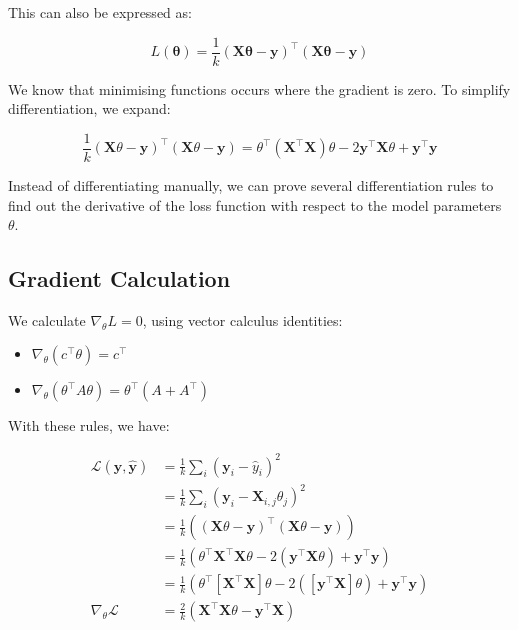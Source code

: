 This can also be expressed as:

\[
    L(\bm{\theta}) = \frac{1}{k} (\bm{X} \bm{\theta} - \bm{y})^\top (\bm{X} \bm{\theta} - \bm{y})
\]

We know that minimising functions occurs where the gradient is zero. To simplify differentiation, we expand:

\[
    \frac{1}{k} (\bm{X} \theta - \bm{y})^\top (\bm{X} \theta - \bm{y})
    = \theta^\top (\bm{X}^\top \bm{X}) \theta - 2 \bm{y}^\top \bm{X} \theta + \bm{y}^\top \bm{y}
\]


Instead of differentiating manually, we can prove several differentiation rules to find out the derivative of the loss function with respect to the model parameters $\theta$.

\subsection{Gradient Calculation}

We calculate \( \nabla_\theta L = 0 \), using vector calculus identities:

\begin{itemize}
    \item \( \nabla_\theta (c^\top \theta) = c^\top \)
    \item \( \nabla_\theta (\theta^\top A \theta) = \theta^\top (A + A^\top) \)
\end{itemize}

With these rules, we have:

\begin{align}
    \mathcal{L}(\bm{y}, \hat{\bm{y}}) & = \frac{1}{k} \sum_i \left( \bm{y}_i - \hat{y}_i \right)^2                                                                               \\
                                      & = \frac{1}{k} \sum_i \left( \bm{y}_i - \bm{X}_{i,j}\theta_j \right)^2                                                                    \\
                                      & = \frac{1}{k} \left( (\bm{X}\theta - \bm{y})^\top (\bm{X}\theta - \bm{y}) \right)                                                        \\
                                      & = \frac{1}{k} \left( \theta^\top \bm{X}^\top \bm{X} \theta - 2 (\bm{y}^\top \bm{X} \theta) + \bm{y}^\top \bm{y} \right)                  \\
                                      & = \frac{1}{k} \left( \theta^\top \left[ \bm{X}^\top \bm{X} \right] \theta - 2 ([\bm{y}^\top \bm{X}] \theta) + \bm{y}^\top \bm{y} \right) \\
    \nabla_\theta \mathcal{L}         & = \frac{2}{k} \left( \bm{X}^\top \bm{X} \theta - \bm{y}^\top \bm{X} \right)
\end{align}

